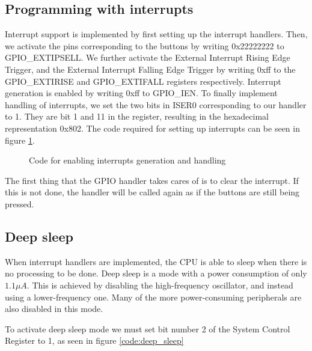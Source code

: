 \subsection{Programming with interrupts}
\label{subsec:dev_pros_interrupts}

Interrupt support is implemented by first setting up the interrupt handlers.
Then, we activate the pins corresponding to the buttons by writing 0x22222222 to GPIO\_EXTIPSELL.
We further activate the External Interrupt Rising Edge Trigger, and the External Interrupt Falling Edge Trigger by writing 0xff to the GPIO\_EXTIRISE and GPIO\_EXTIFALL registers respectively.
Interrupt generation is enabled by writing 0xff to GPIO\_IEN.
To finally implement handling of interrupts, we set the two bits in ISER0 corresponding to our handler to 1. They are bit 1 and 11 in the register, resulting in the hexadecimal representation 0x802.
The code required for setting up interrupts can be seen in figure \ref{code:interrupt_setup}.

\begin{figure}[h!]
\caption{Code for enabling interrupts generation and handling}
\label{code:interrupt_setup}
\end{figure}


The first thing that the GPIO handler takes cares of is to clear the interrupt. If this is not done, the handler will be called again as if the buttons are still being pressed.

\subsection{Deep sleep}
\label{subsec:dev_pros_deep_sleep}

When interrupt handlers are implemented, the CPU is able to sleep when there is no processing to be done.
Deep sleep is a mode with a power consumption of only $1.1 \mu A$.
This is achieved by disabling the high-frequency oscillator, and instead using a lower-frequency one.
Many of the more power-consuming peripherals are also disabled in this mode.

To activate deep sleep mode we must set bit number 2 of the System Control Register to 1, as seen in figure \ref{code:deep_sleep}

